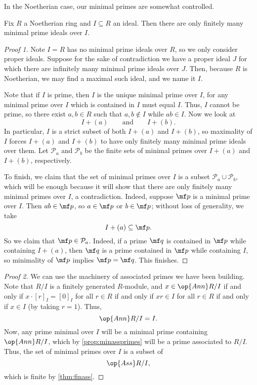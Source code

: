 In the Noetherian case, our minimal primes are somewhat controlled.
\begin{prop} \label{prop:finminprimes}
	Fix $R$ a Noetherian ring and $I\subseteq R$ an ideal. Then there are only finitely many minimal prime ideals over $I$.
\end{prop}
\begin{proof}[Proof 1]
	Note $I=R$ has no minimal prime ideals over $R$, so we only consider proper ideals. Suppose for the sake of contradiction we have a proper ideal $J$ for which there are infinitely many minimal prime ideals over $J$. Then, because $R$ is Noetherian, we may find a maximal such ideal, and we name it $I$.
	
	Note that if $I$ is prime, then $I$ is the unique minimal prime over $I$, for any minimal prime over $I$ which is contained in $I$ must equal $I$. Thus, $I$ cannot be prime, so there exist $a,b\in R$ such that $a,b\notin I$ while $ab\in I$. Now we look at
	\[I+(a)\qquad\text{and}\qquad I+(b).\]
	In particular, $I$ is a strict subset of both $I+(a)$ and $I+(b)$, so maximality of $I$ forces $I+(a)$ and $I+(b)$ to have only finitely many minimal prime ideals over them. Let $\mathcal P_a$ and $\mathcal P_b$ be the finite sets of minimal primes over $I+(a)$ and $I+(b)$, respectively.

	To finish, we claim that the set of minimal primes over $I$ is a subset $\mathcal P_a\cup\mathcal P_b$, which will be enough because it will show that there are only finitely many minimal primes over $I$, a contradiction. Indeed, suppose $\mf p$ is a minimal prime over $I$. Then $ab\in\mf p$, so $a\in\mf p$ or $b\in\mf p$; without loss of generality, we take
	\[I+(a)\subseteq\mf p.\]
	So we claim that $\mf p\in\mathcal P_a$. Indeed, if a prime $\mf q$ is contained in $\mf p$ while containing $I+(a)$, then $\mf q$ is a prime contained in $\mf p$ while containing $I$, so minimality of $\mf p$ implies $\mf p=\mf q$. This finishes.
\end{proof}
\begin{proof}[Proof 2]
	We can use the machinery of associated primes we have been building. Note that $R/I$ is a finitely generated $R$-module, and $x\in\op{Ann}R/I$ if and only if $x\cdot[r]_I=[0]_I$ for all $r\in R$ if and only if $xr\in I$ for all $r\in R$ if and only if $x\in I$ (by taking $r=1$). Thus,
	\[\op{Ann}R/I=I.\]
	Now, any prime minimal over $I$ will be a minimal prime containing $\op{Ann}R/I$, which by \autoref{prop:minassprimes} will be a prime associated to $R/I$. Thus, the set of minimal primes over $I$ is a subset of
	\[\op{Ass}R/I,\]
	which is finite by \autoref{thm:finass}.
\end{proof}

